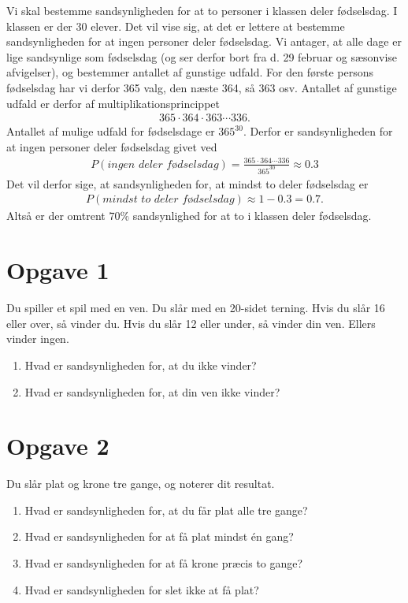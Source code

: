 \begin{exa}

Vi skal bestemme sandsynligheden for at to personer i klassen deler fødselsdag. I klassen er der 30 elever. Det vil vise sig, at det er lettere at bestemme sandsynligheden for at ingen personer deler fødselsdag. Vi antager, at alle dage er lige sandsynlige som fødselsdag (og ser derfor bort fra d. 29 februar og sæsonvise afvigelser), og bestemmer antallet af gunstige udfald. For den første persons fødselsdag har vi derfor 365 valg, den næste 364, så 363 osv. Antallet af gunstige udfald er derfor af multiplikationsprincippet
\begin{align*}
365\cdot 364\cdot 363 \cdots 336.
\end{align*}
Antallet af mulige udfald for fødselsdage er $365^{30}$. Derfor er sandsynligheden for at ingen personer deler fødselsdag givet ved
\begin{align*}
P(\textit{ingen deler fødselsdag}) = \frac{365\cdot 364 \cdots 336}{365^{30}} \approx 0.3
\end{align*}
Det vil derfor sige, at sandsynligheden for, at mindst to deler fødselsdag er 
\begin{align*}
P(\textit{mindst to deler fødselsdag}) \approx 1-0.3 = 0.7.
\end{align*}
Altså er der omtrent $70\%$ sandsynlighed for at to i klassen deler fødselsdag. 
\end{exa}

\section*{Opgave 1}
Du spiller et spil med en ven. Du slår med en 20-sidet terning. Hvis du slår 16 eller over, så vinder du. Hvis du slår 12 eller under, så vinder din ven. Ellers vinder ingen.
\begin{enumerate}[label=\roman*)]
	\item Hvad er sandsynligheden for, at du ikke vinder?
	\item Hvad er sandsynligheden for, at din ven ikke vinder?
\end{enumerate}

\section*{Opgave 2}
Du slår plat og krone tre gange, og noterer dit resultat.
\begin{enumerate}[label=\roman*)]
	\item Hvad er sandsynligheden for, at du får plat alle tre gange?
	\item Hvad er sandsynligheden for at få plat mindst én gang?
	\item Hvad er sandsynligheden for at få krone præcis to gange?
	\item Hvad er sandsynligheden for slet ikke at få plat?
\end{enumerate}

